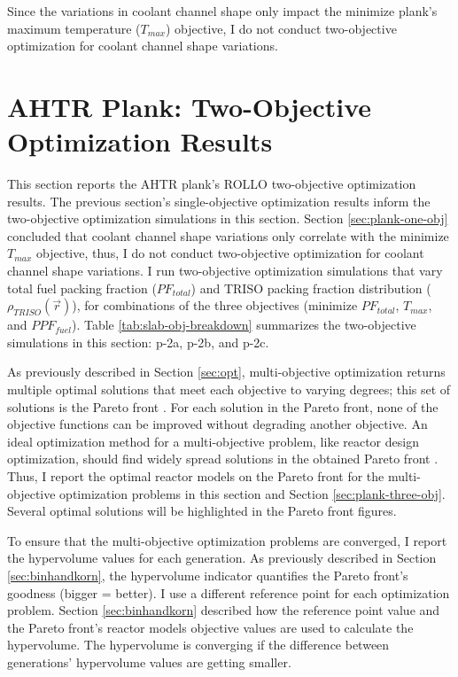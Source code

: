 Since the variations in coolant channel shape only impact the minimize plank's maximum 
temperature ($T_{max}$) objective, I do not conduct two-objective 
optimization for coolant channel shape variations.  

\section{AHTR Plank: Two-Objective Optimization Results}
\label{sec:plank-two-obj}
This section reports the \gls{AHTR} plank's \gls{ROLLO} two-objective optimization 
results. 
The previous section's single-objective optimization results inform the two-objective 
optimization simulations in this section.
Section \ref{sec:plank-one-obj} concluded that coolant channel shape variations 
only correlate with the minimize $T_{max}$ objective, thus, I do not conduct 
two-objective optimization for coolant channel shape variations.
I run two-objective optimization simulations that vary total fuel packing 
fraction ($PF_{total}$) and \gls{TRISO} packing fraction distribution 
($\rho_{TRISO}(\vec{r})$), for combinations of the three objectives (minimize 
$PF_{total}$, $T_{max}$, and $PPF_{fuel}$). 
Table \ref{tab:slab-obj-breakdown} summarizes the two-objective simulations in 
this section: p-2a, p-2b, and p-2c.

As previously described in Section \ref{sec:opt}, multi-objective optimization returns 
multiple optimal solutions that meet each objective to varying degrees; this set of 
solutions is the Pareto front \cite{deb_multi-objective_2001}. 
For each solution in the Pareto front, none of the objective functions can be 
improved without degrading another objective.
An ideal optimization method for a multi-objective problem, like reactor design 
optimization, should find widely spread solutions in the obtained Pareto front 
\cite{deb_multi-objective_2001}. 
Thus, I report the optimal reactor models on the Pareto front for the multi-objective 
optimization problems in this section and Section \ref{sec:plank-three-obj}. 
Several optimal solutions will be highlighted in the Pareto front figures. 

To ensure that the multi-objective optimization problems are converged, I report the 
hypervolume values for each generation. 
As previously described in Section \ref{sec:binhandkorn}, the hypervolume indicator 
quantifies the Pareto front's goodness (bigger = better).
I use a different reference point for each optimization problem.
Section \ref{sec:binhandkorn} described how the reference point value and 
the Pareto front's reactor models objective values are used to calculate the 
hypervolume. 
The hypervolume is converging if the difference between generations' hypervolume values 
are getting smaller. 

